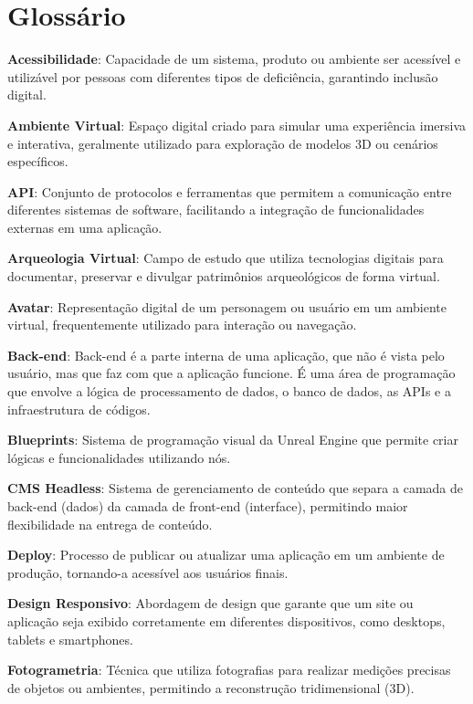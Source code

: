 \chapter*{\centering Glossário}\label{glossario}
\textbf{Acessibilidade}: Capacidade de um sistema, produto ou ambiente ser acessível e utilizável por pessoas com diferentes tipos de deficiência, garantindo inclusão digital.

\textbf{Ambiente Virtual}: Espaço digital criado para simular uma experiência imersiva e interativa, geralmente utilizado para exploração de modelos 3D ou cenários específicos.

\textbf{API}: Conjunto de protocolos e ferramentas que permitem a comunicação entre diferentes sistemas de software, facilitando a integração de funcionalidades externas em uma aplicação.

\textbf{Arqueologia Virtual}: Campo de estudo que utiliza tecnologias digitais para documentar, preservar e divulgar patrimônios arqueológicos de forma virtual.

\textbf{Avatar}: Representação digital de um personagem ou usuário em um ambiente virtual, frequentemente utilizado para interação ou navegação.

\textbf{Back-end}: Back-end é a parte interna de uma aplicação, que não é vista pelo usuário, mas que faz com que a aplicação funcione. É uma área de programação que envolve a lógica de processamento de dados, o banco de dados, as APIs e a infraestrutura de códigos. 

\textbf{Blueprints}: Sistema de programação visual da Unreal Engine que permite criar lógicas e funcionalidades utilizando nós.

\textbf{CMS Headless}: Sistema de gerenciamento de conteúdo que separa a camada de back-end (dados) da camada de front-end (interface), permitindo maior flexibilidade na entrega de conteúdo.

\textbf{Deploy}: Processo de publicar ou atualizar uma aplicação em um ambiente de produção, tornando-a acessível aos usuários finais.

\textbf{Design Responsivo}: Abordagem de design que garante que um site ou aplicação seja exibido corretamente em diferentes dispositivos, como desktops, tablets e smartphones.

\textbf{Fotogrametria}: Técnica que utiliza fotografias para realizar medições precisas de objetos ou ambientes, permitindo a reconstrução tridimensional (3D).

